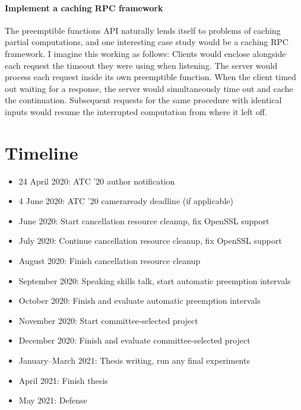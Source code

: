 \documentclass[12pt,letterpaper,openright]{report}
\begin{document}
\paragraph{Implement a caching RPC framework}
The preemptible functions API naturally lends itself to problems of caching partial
computations, and one interesting case study would be a caching RPC framework.  I
imagine this working as follows:  Clients would enclose alongside each request the
timeout they were using when listening.  The server would process each request inside
its own preemptible function.  When the client timed out waiting for a response, the
server would simultaneously time out and cache the continuation.  Subsequent requests
for the same procedure with identical inputs would resume the interrupted computation
from where it left off.


\section{Timeline}

\begin{itemize}
\item 24 April 2020: ATC '20 author notification
\item 4 June 2020: ATC '20 cameraready deadline (if applicable)
\item June 2020: Start cancellation resource cleanup, fix OpenSSL support
\item July 2020: Continue cancellation resource cleanup, fix OpenSSL support
\item August 2020: Finish cancellation resource cleanup
\item September 2020: Speaking skills talk, start automatic preemption intervals
\item October 2020: Finish and evaluate automatic preemption intervals
\item November 2020: Start committee-selected project
\item December 2020: Finish and evaluate committee-selected project
\item January--March 2021: Thesis writing, run any final experiments
\item April 2021: Finish thesis
\item May 2021: Defense
\end{itemize}


\newpage
{}

\end{document}
